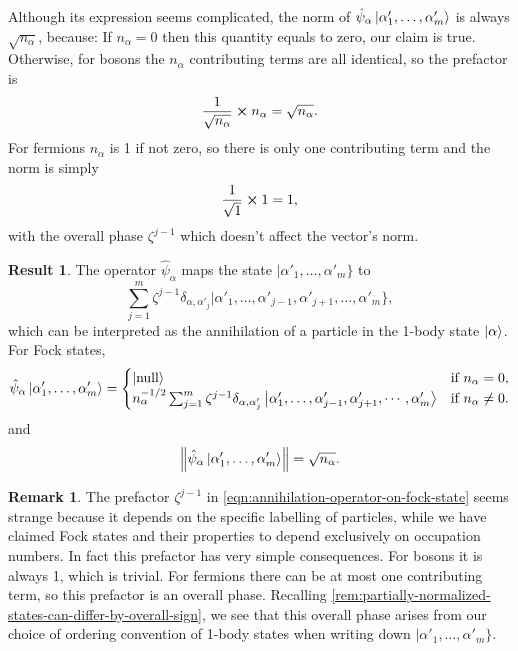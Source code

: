 \documentclass{article}
\theoremstyle{definition}
\newtheorem{res}{Result}[section]
\newtheorem{rem}{Remark}[section]
\theoremstyle{plain}
\numberwithin{equation}{section}
\begin{document}
Although its expression seems complicated, 
the norm of 
$\hat{\psi}_{\alpha}\ket{\alpha'_{1}, \ldots ,\alpha'_{m}}$ 
is always $\sqrt{n_{\alpha}}$, because:
If $n_{\alpha}=0$ then this quantity equals to zero, 
our claim is true. Otherwise, for bosons 
the $n_{\alpha}$ contributing terms are all identical, 
so the prefactor is 
\[
    \frac{1}{\sqrt{n_{\alpha}}}
    \cross 
    n_{\alpha}
    =
    \sqrt{n_{\alpha}}.
\]
For fermions $n_{\alpha}$ is 1 if not zero, 
so there is only one contributing term and the norm 
is simply 
\[
    \frac{1}{\sqrt{1}}\cross 1=1,
\]
with the overall phase $\zeta^{j-1}$ 
which doesn't affect the vector's norm.


\begin{graybox}

\begin{res}
    The operator $\hat{\psi}_{\alpha}$
    maps the state $|\alpha'_{1}, \ldots ,\alpha'_{m}\}$ to
    \[
        \sum_{j=1}^{m}
        \zeta^{j-1}
    \delta_{\alpha,\alpha'_{j}}
    |\alpha'_{1}, \ldots ,\alpha'_{j-1},
    \alpha'_{j+1}, \ldots ,\alpha'_{m}\},
    \]
    which can be interpreted as 
    the annihilation of a particle 
    in the 1-body state $\ket{\alpha}$. 
    For Fock states,
    \begin{equation}
    \hat{\psi}_{\alpha}
    \ket{\alpha'_{1}, \ldots ,\alpha'_{m}}
    =
    \begin{cases}
        \ket{\text{null}} & \text{if  } n_{\alpha}=0,\\
        n_{\alpha}^{-1 /2}
        \sum_{j=1}^{m}
    \zeta^{j-1}
    \delta_{\alpha,\alpha'_{j}}
    \ket{
        \alpha'_{1}, \ldots ,
        \alpha'_{j-1},\alpha'_{j+1},
        \cdots ,\alpha'_{m}
    }
    & \text{if  } n_{\alpha}\neq 0.
    \end{cases}
    \label{eqn:annihilation-operator-on-fock-state}
    \end{equation}
    and 
    \begin{equation}
        \norm{
            \hat{\psi}_{\alpha}
            \ket{\alpha'_{1}, \ldots ,\alpha'_{m}}
        }
        =
        \sqrt{n_{\alpha}}.
    \end{equation}
\end{res}    

\end{graybox}

\begin{rem}
    The prefactor $\zeta^{j-1}$ in 
    \cref{eqn:annihilation-operator-on-fock-state} 
    seems strange because 
    it depends on the specific labelling of particles, 
    while we have claimed Fock states and their 
    properties to 
    depend exclusively on occupation numbers. 
    In fact this prefactor has very simple 
    consequences. 
    For bosons it is always 1, which is trivial. 
    For fermions there can be at most 
    one contributing term, 
    so this prefactor is an overall phase. 
    Recalling \cref{rem:partially-normalized-states-can-differ-by-overall-sign}, 
    we see that this overall phase arises from our 
    choice of ordering convention of 1-body states 
    when writing down 
    $|\alpha'_{1}, \ldots ,\alpha'_{m}\}$.
\end{rem}
\end{document}
